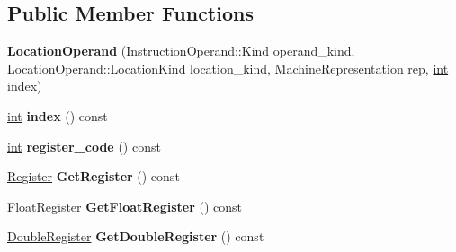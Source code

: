 \subsection*{Public Member Functions}
\begin{DoxyCompactItemize}
\item 
\mbox{\label{classv8_1_1internal_1_1compiler_1_1LocationOperand_a0122a8300b2c16ca73ee2f0929aec02b}} 
{\bfseries Location\+Operand} (Instruction\+Operand\+::\+Kind operand\+\_\+kind, Location\+Operand\+::\+Location\+Kind location\+\_\+kind, Machine\+Representation rep, \mbox{\hyperlink{classint}{int}} index)
\item 
\mbox{\label{classv8_1_1internal_1_1compiler_1_1LocationOperand_a9acee6bac22dead7ca05c029fbe06c58}} 
\mbox{\hyperlink{classint}{int}} {\bfseries index} () const
\item 
\mbox{\label{classv8_1_1internal_1_1compiler_1_1LocationOperand_af7743c2f9ab674964e726870f9417aa2}} 
\mbox{\hyperlink{classint}{int}} {\bfseries register\+\_\+code} () const
\item 
\mbox{\label{classv8_1_1internal_1_1compiler_1_1LocationOperand_a4d0fbceae25211d1d46526546eb53c0b}} 
\mbox{\hyperlink{classv8_1_1internal_1_1Register}{Register}} {\bfseries Get\+Register} () const
\item 
\mbox{\label{classv8_1_1internal_1_1compiler_1_1LocationOperand_a7dce77288b6c26c8f746133d76ab4bd5}} 
\mbox{\hyperlink{classv8_1_1internal_1_1SwVfpRegister}{Float\+Register}} {\bfseries Get\+Float\+Register} () const
\item 
\mbox{\label{classv8_1_1internal_1_1compiler_1_1LocationOperand_ab1e52ef65a34122d28d5c75d064f82bc}} 
\mbox{\hyperlink{classv8_1_1internal_1_1DoubleRegister}{Double\+Register}} {\bfseries Get\+Double\+Register} () const
\item 
\mbox{\label{classv8_1_1internal_1_1compiler_1_1LocationOperand_a560194c8900ca42472e15f2d97a77dbd}} 

\end{DoxyCompactItemize}
